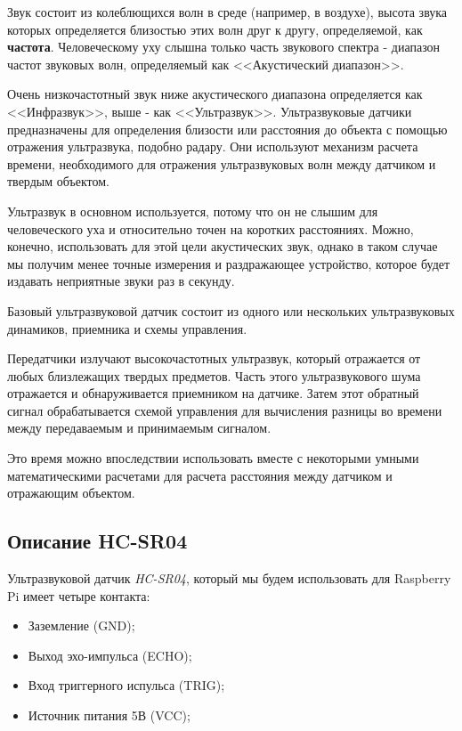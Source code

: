 \documentclass[a4paper, 14pt]{article}
\begin{document}
Звук состоит из колеблющихся волн в среде (например, в воздухе), высота звука которых определяется близостью этих волн друг к другу, определяемой, как \textbf{частота}. Человеческому уху слышна только часть звукового спектра - диапазон частот звуковых волн, определяемый как <<Акустический диапазон>>.

Очень низкочастотный звук ниже акустического диапазона определяется как <<Инфразвук>>, выше - как <<Ультразвук>>. Ультразвуковые датчики предназначены для определения близости или расстояния до объекта с помощью отражения ультразвука, подобно радару. Они используют механизм расчета времени, необходимого для отражения ультразвуковых волн между датчиком и твердым объектом.

Ультразвук в основном используется, потому что он не слышим для человеческого уха и относительно точен на коротких расстояниях. Можно, конечно, использовать для этой цели акустических звук, однако в таком случае мы получим менее точные измерения и раздражающее устройство, которое будет издавать неприятные звуки раз в секунду.

Базовый ультразвуковой датчик состоит из одного или нескольких ультразвуковых динамиков, приемника и схемы управления.

Передатчики излучают высокочастотных ультразвук, который отражается от любых близлежащих твердых предметов. Часть этого ультразвукового шума отражается и обнаруживается приемником на датчике. Затем этот обратный сигнал обрабатывается схемой управления для вычисления разницы во времени между передаваемым и принимаемым сигналом.

Это время можно впоследствии использовать вместе с некоторыми умными математическими расчетами для расчета расстояния между датчиком и отражающим объектом.

\subsection{Описание HC-SR04}

Ультразвуковой датчик \textit{HC-SR04}, который мы будем использовать для Raspberry Pi имеет четыре контакта:

\begin{itemize}
	\item Заземление (GND);
	\item Выход эхо-импульса (ECHO);
	\item Вход триггерного испульса (TRIG);
	\item Источник питания 5В (VCC);
\end{itemize}
\end{document}
